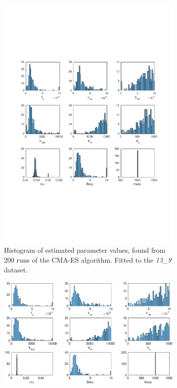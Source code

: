 \documentclass[10pt,journal]{./IEEE_latex_class/IEEEtran}
\begin{document}
 
\begin{figure}
    \begin{subfigure}[h]{0.49\textwidth}
    \centering
        \includegraphics[scale = 0.24, clip = true, trim = 140 0 125 0]{13_9_hist}
        \caption{Histogram of estimated parameter values, found from 200 runs of the CMA-ES algorithm. Fitted to the \textit{13\_9} dataset.}
        \label{InitialResults_13_9_hist}
    \end{subfigure}
    \begin{subfigure}[c]{0.49\textwidth}
    \centering
        \includegraphics[scale = 0.24,clip = true, trim = 140 0 125 0]{14_7_hist}

\end{subfigure}
\end{figure}
\end{document}
